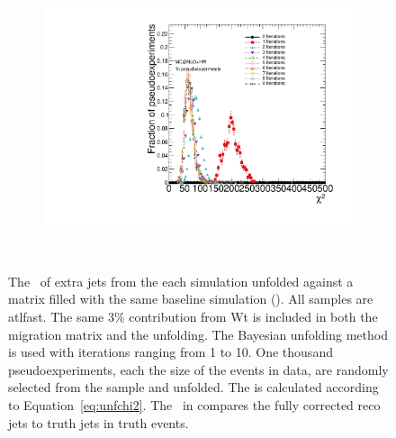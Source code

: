 \begin{figure}
\begin{subfigure}[]{0.45\textwidth}
\end{subfigure}
~
\begin{subfigure}[]{0.45\textwidth}
\includegraphics[width=\textwidth]{fig/Stress/105200atlfast/AvgChi2.pdf}
\end{subfigure}
~
\caption{The \chisq\ of extra jets from the each \ttbar simulation unfolded against a matrix filled with the same baseline \ttbar simulation (\powpy). All samples are atlfast. The same 3\% contribution from Wt is included in both the migration matrix and the unfolding. The Bayesian unfolding method is used with iterations ranging from 1 to 10. One thousand pseudoexperiments, each the size of the events in data, are randomly selected from the sample and unfolded. The \chisq is calculated according to Equation~\ref{eq:unfchi2}. 
The \chisq\ in compares the fully corrected reco jets to truth jets in truth events.}
\end{figure}
\label{f:stresschi}
\clearpage